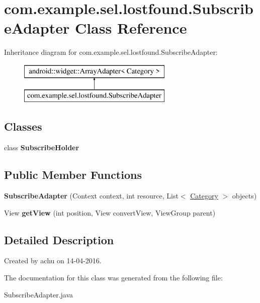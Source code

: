 \hypertarget{classcom_1_1example_1_1sel_1_1lostfound_1_1SubscribeAdapter}{\section{com.\-example.\-sel.\-lostfound.\-Subscribe\-Adapter Class Reference}
\label{classcom_1_1example_1_1sel_1_1lostfound_1_1SubscribeAdapter}
}
Inheritance diagram for com.\-example.\-sel.\-lostfound.\-Subscribe\-Adapter\-:\begin{figure}[H]
\begin{center}
\leavevmode
\includegraphics[height=2.000000cm]{classcom_1_1example_1_1sel_1_1lostfound_1_1SubscribeAdapter}
\end{center}
\end{figure}
\subsection*{Classes}
\begin{DoxyCompactItemize}
\item 
class {\bfseries Subscribe\-Holder}
\end{DoxyCompactItemize}
\subsection*{Public Member Functions}
\begin{DoxyCompactItemize}
\item 
\hypertarget{classcom_1_1example_1_1sel_1_1lostfound_1_1SubscribeAdapter_ad5670875fa5fcc236d9c794303f04369}{{\bfseries Subscribe\-Adapter} (Context context, int resource, List$<$ \hyperlink{classcom_1_1example_1_1sel_1_1lostfound_1_1Category}{Category} $>$ objects)}\label{classcom_1_1example_1_1sel_1_1lostfound_1_1SubscribeAdapter_ad5670875fa5fcc236d9c794303f04369}

\item 
\hypertarget{classcom_1_1example_1_1sel_1_1lostfound_1_1SubscribeAdapter_a942f195e46312808aff706a8a4e15e02}{View {\bfseries get\-View} (int position, View convert\-View, View\-Group parent)}\label{classcom_1_1example_1_1sel_1_1lostfound_1_1SubscribeAdapter_a942f195e46312808aff706a8a4e15e02}

\end{DoxyCompactItemize}


\subsection{Detailed Description}
Created by achu on 14-\/04-\/2016. 

The documentation for this class was generated from the following file\-:\begin{DoxyCompactItemize}
\item 
Subscribe\-Adapter.\-java\end{DoxyCompactItemize}
